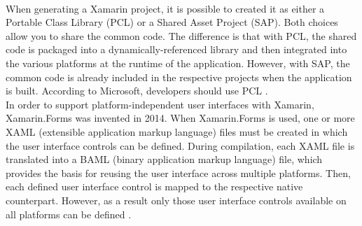 \documentclass[Bachelor,BIF,english]{twbook}
\begin{document}
\\[\baselineskip]
When generating a Xamarin project, it is possible to created it as either a Portable Class Library (PCL) or a Shared Asset Project (SAP). Both choices allow you to share the common code. The difference is that with PCL, the shared code is packaged into a dynamically-referenced library and then integrated into the various platforms at the runtime of the application. However, with SAP, the common code is already included in the respective projects when the application is built. According to Microsoft, developers should use PCL \cite[p.~16]{ZubaBernhard2017EdPb} \cite[p.~8-9]{Dickson_2013}.
\\[\baselineskip] 
In order to support platform-independent user interfaces with Xamarin, Xamarin.Forms was invented in 2014. When Xamarin.Forms is used, one or more XAML (extensible application markup language) files must be created in which the user interface controls can be defined. During compilation, each XAML file is translated into a BAML (binary application markup language) file, which provides the basis for reusing the user interface across multiple platforms. Then, each defined user interface control is mapped to the respective native counterpart. However, as a result only those user interface controls available on all platforms can be defined \cite[p.~17-18]{ZubaBernhard2017EdPb}.
\end{document}
